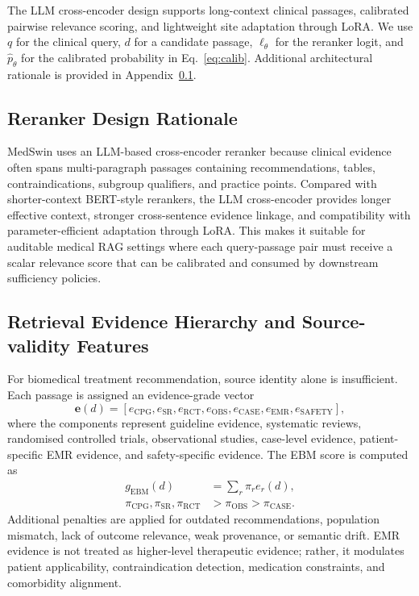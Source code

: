 \documentclass[conference]{IEEEtran}
\begin{document}
The LLM cross-encoder design supports long-context clinical passages, calibrated pairwise relevance scoring, and lightweight site adaptation through LoRA. We use $q$ for the clinical query, $d$ for a candidate passage, $\ell_\theta$ for the reranker logit, and $\widehat{p}_\theta$ for the calibrated probability in Eq.~\ref{eq:calib}. Additional architectural rationale is provided in Appendix~\ref{app:reranker-design-rationale}.


\subsection{Reranker Design Rationale}
\label{app:reranker-design-rationale}

MedSwin uses an LLM-based cross-encoder reranker because clinical evidence often spans multi-paragraph passages containing recommendations, tables, contraindications, subgroup qualifiers, and practice points. Compared with shorter-context BERT-style rerankers, the LLM cross-encoder provides longer effective context, stronger cross-sentence evidence linkage, and compatibility with parameter-efficient adaptation through LoRA. This makes it suitable for auditable medical RAG settings where each query-passage pair must receive a scalar relevance score that can be calibrated and consumed by downstream sufficiency policies.


\subsection{Retrieval Evidence Hierarchy and Source-validity Features}
\label{app:evidence-hierarchy}

For biomedical treatment recommendation, source identity alone is insufficient. Each passage is assigned an evidence-grade vector
\[
\mathbf{e}(d)=
[
e_{\mathrm{CPG}},
e_{\mathrm{SR}},
e_{\mathrm{RCT}},
e_{\mathrm{OBS}},
e_{\mathrm{CASE}},
e_{\mathrm{EMR}},
e_{\mathrm{SAFETY}}
],
\]
where the components represent guideline evidence, systematic reviews, randomised controlled trials, observational studies, case-level evidence, patient-specific EMR evidence, and safety-specific evidence. The EBM score is computed as
\begin{equation}
\begin{aligned}
g_{\mathrm{EBM}}(d) &= \sum_{r} \pi_r e_r(d), \\
\pi_{\mathrm{CPG}}, \pi_{\mathrm{SR}}, \pi_{\mathrm{RCT}} &> \pi_{\mathrm{OBS}} > \pi_{\mathrm{CASE}}.
\end{aligned}
\end{equation}
Additional penalties are applied for outdated recommendations, population mismatch, lack of outcome relevance, weak provenance, or semantic drift. EMR evidence is not treated as higher-level therapeutic evidence; rather, it modulates patient applicability, contraindication detection, medication constraints, and comorbidity alignment.
\end{document}
